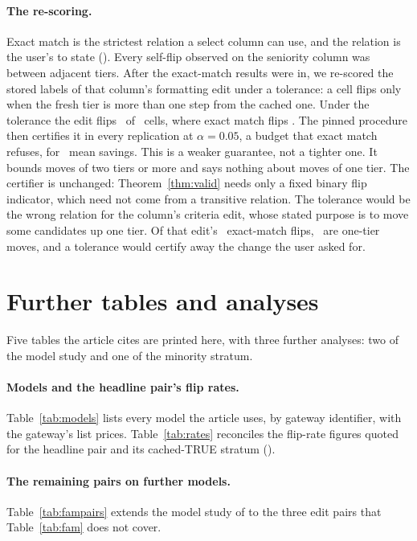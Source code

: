 \paragraph{The re-scoring.} Exact match is the
strictest relation a select column can use, and the relation is the
user's to state (). Every self-flip observed on the
seniority column was between adjacent tiers. After the exact-match
results were in, we re-scored the stored labels of that
column's formatting edit under a tolerance: a cell flips only when the
fresh tier is more than one step from the cached one. Under the
tolerance the edit flips \gradedFlipsDjFmt\ of \benchN\ cells, where
exact match flips \flipDjFormatting. The pinned procedure then
certifies it in every replication at $\alpha{=}0.05$, a budget that
exact match refuses, for \gradedSavingsEdgeDjFmt\ mean savings. This is
a weaker guarantee, not a tighter one. It bounds moves of two tiers or
more and says nothing about moves of one tier. The certifier is
unchanged: Theorem~\ref{thm:valid} needs only a fixed binary flip
indicator, which need not come from a transitive relation. The
tolerance would be the wrong relation for the column's criteria edit,
whose stated purpose is to move some candidates up one tier. Of that
edit's \gradedCritExactFlips\ exact-match flips,
\gradedCritOneTier\ are one-tier moves, and a tolerance would certify
away the change the user asked for.

\FloatBarrier
\keepheading
\section{Further tables and analyses}
\label{app:tables}
Five tables the article cites are printed here, with three further
analyses: two of the model study and one of the minority stratum.

\keeprunin
\paragraph{Models and the headline pair's flip rates.}
Table~\ref{tab:models} lists every model the article uses, by gateway
identifier, with the gateway's list prices. Table~\ref{tab:rates}
reconciles the flip-rate figures quoted for the headline pair and its
cached-TRUE stratum ().

\keeprunin
\paragraph{The remaining pairs on further models.}
Table~\ref{tab:fampairs} extends the model study of
 to the three edit pairs that
Table~\ref{tab:fam} does not cover.

